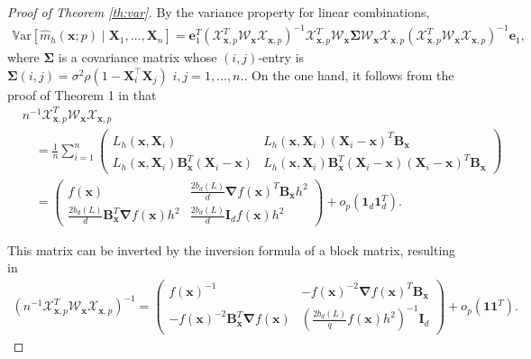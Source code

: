 \documentclass[12pt]{report} %
\newcommand{\bX}{\mathbf{X}}
\newcommand{\bx}{\mathbf{x}}
\newcommand{\be}{\mathbf{e}}
\newcommand{\bSigma}{\boldsymbol\Sigma}
\newcommand{\bB}{\mathbf{B}}
\newcommand{\lc}{\left[}
\newcommand{\rc}{\right]}
\newcommand{\V}[1]{\mathbb{V}\mathrm{ar}\lc #1\rc}
\begin{document}
\begin{proof}[Proof of Theorem \ref{th:var}] By the variance property for linear combinations,
\begin{align}
\V{\hat{m}_{h}(\bx;p) \mid \bX_1, \ldots, \bX_n}=\be_1^T\left(\mathcal{X}_{\bx, p}^T \mathcal{W}_{\bx} \mathcal{X}_{\bx, p}\right)^{-1} \mathcal{X}_{\bx, p}^T \mathcal{W}_{\bx} \bSigma \mathcal{W}_{\bx} \mathcal{X}_{\bx, p}\left(\mathcal{X}_{\bx, p}^T \mathcal{W}_{\bx} \mathcal{X}_{\bx, p}\right)^{-1} \be_1,\label{eq:var}
\end{align}
where $\bSigma$ is a covariance matrix whose $(i,j)$-entry is $\bSigma(i, j)=\sigma^2 \rho(1- \bX_i^\top\bX_j)$ $i,j=1,\dots,n.$. On the one hand, it follows from the proof of Theorem 1 in \citet{Garcia-Portugues2016} that
$$
\begin{aligned}
& n^{-1} \mathcal{X}_{\bx, p}^T \mathcal{W}_{\bx} \mathcal{X}_{\bx, p} \\
& \quad=\frac{1}{n} \sum_{i=1}^n\left(\begin{array}{cc}
L_h\left(\bx, \bX_i\right) & L_h\left(\bx, \bX_i\right)\left(\bX_i-\bx\right)^T \bB_{\bx} \\
L_h\left(\bx, \bX_i\right) \bB_{\bx}^T\left(\bX_i-\bx\right) & L_h\left(\bx, \bX_i\right) \bB_{\bx}^T\left(\bX_i-\bx\right)\left(\bX_i-\bx\right)^T \bB_{\bx}
\end{array}\right) \\
& \quad=\left(\begin{array}{cc}
f(\bx) & \frac{2 b_d(L)}{d} \boldsymbol{\nabla} f(\bx)^T \bB_{\bx} h^2 \\
\frac{2 b_d(L)}{d} \bB_{\bx}^T \boldsymbol{\nabla} f(\bx) h^2 & \frac{2 b_d(L)}{d} \mathbf{I}_d f(\bx) h^2
\end{array}\right)+o_p\left(\mathbf{1}_d \mathbf{1}_d^T\right).
\end{aligned}
$$

This matrix can be inverted by the inversion formula of a block matrix, resulting in
\begin{align}
\left(n^{-1} \mathcal{X}_{\bx, p}^T \mathcal{W}_{\bx} \mathcal{X}_{\bx, p}\right)^{-1}=\left(\begin{array}{cc}
f(\bx)^{-1} & -f(\bx)^{-2} \boldsymbol{\nabla} f(\bx)^T \bB_{\bx} \\
-f(\bx)^{-2} \bB_{\bx}^T \boldsymbol{\nabla} f(\bx) & \left(\frac{2 b_d(L)}{q} f(\bx) h^2\right)^{-1} \mathbf{I }_d
\end{array}\right)+o_p\left(\mathbf{1 1}^T\right).\label{eq:var1}
\end{align}


\end{proof}
\end{document}
